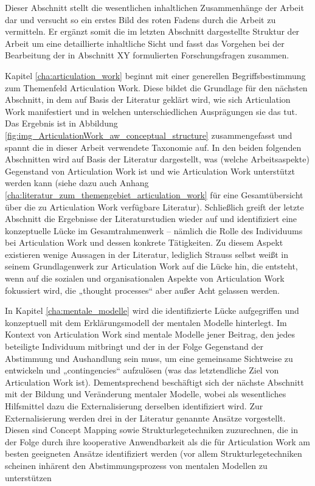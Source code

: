Dieser Abschnitt stellt die wesentlichen inhaltlichen Zusammenhänge der Arbeit dar und versucht so ein erstes Bild des roten Fadens durch die Arbeit zu vermitteln. Er ergänzt somit die im letzten Abschnitt dargestellte Struktur der Arbeit um eine detaillierte inhaltliche Sicht und fasst das Vorgehen bei der Bearbeitung der in Abschnitt XY formulierten Forschungsfragen zusammen.

Kapitel \ref{cha:articulation_work} beginnt mit einer generellen Begriffsbestimmung zum Themenfeld Articulation Work. Diese bildet die Grundlage für den nächsten Abschnitt, in dem auf Basis der Literatur geklärt wird, wie sich Articulation Work manifestiert und in welchen unterschiedlichen Ausprägungen sie das tut. Das Ergebnis ist in Abbildung \ref{fig:img_ArticulationWork_aw_conceptual_structure} zusammengefasst und spannt die in dieser Arbeit verwendete Taxonomie auf. In den beiden folgenden Abschnitten wird auf Basis der Literatur dargestellt, was (welche Arbeitsaspekte) Gegenstand von Articulation Work ist und wie Articulation Work unterstützt werden kann (siehe dazu auch Anhang \ref{cha:literatur_zum_themengebiet_articulation_work} für eine Gesamtübersicht über die zu Articulation Work verfügbare Literatur). Schließlich greift der letzte Abschnitt die Ergebnisse der Literaturstudien wieder auf und identifiziert eine konzeptuelle Lücke im Gesamtrahmenwerk -- nämlich die Rolle des Individuums bei Articulation Work und dessen konkrete Tätigkeiten. Zu diesem Aspekt existieren wenige Aussagen in der Literatur, lediglich Strauss selbst weißt in seinem Grundlagenwerk zur Articulation Work auf die Lücke hin, die entsteht, wenn auf die sozialen und organisationalen Aspekte von Articulation Work fokussiert wird, die „thought processes“ aber außer Acht gelassen werden.

In Kapitel \ref{cha:mentale_modelle} wird die identifizierte Lücke aufgegriffen und konzeptuell mit dem Erklärungsmodell der mentalen Modelle hinterlegt. Im Kontext von Articulation Work sind mentale Modelle jener Beitrag, den jedes beteiligte Individuum mitbringt und der in der Folge Gegenstand der Abstimmung und Aushandlung sein muss, um eine gemeinsame Sichtweise zu entwickeln und „contingencies“ aufzulösen (was das letztendliche Ziel von Articulation Work ist). Dementsprechend beschäftigt sich der nächste Abschnitt mit der Bildung und Veränderung mentaler Modelle, wobei als wesentliches Hilfsmittel dazu die Externalisierung derselben identifiziert wird. Zur Externalisierung werden drei in der Literatur genannte Ansätze vorgestellt. Diesen sind Concept Mapping sowie Strukturlegetechniken zuzurechnen, die in der Folge durch ihre kooperative Anwendbarkeit als die für Articulation Work am besten geeigneten Ansätze identifiziert werden (vor allem Strukturlegetechniken scheinen inhärent den Abstimmungsprozess von mentalen Modellen zu unterstützen

